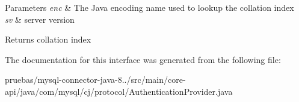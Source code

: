 \begin{DoxyParams}{Parameters}
{\em enc} & The Java encoding name used to lookup the collation index \\
\hline
{\em sv} & server version \\
\hline
\end{DoxyParams}
\begin{DoxyReturn}{Returns}
collation index 
\end{DoxyReturn}


The documentation for this interface was generated from the following file\+:\begin{DoxyCompactItemize}
\item 
pruebas/mysql-\/connector-\/java-\/8../src/main/core-\/api/java/com/mysql/cj/protocol/Authentication\+Provider.\+java\end{DoxyCompactItemize}
